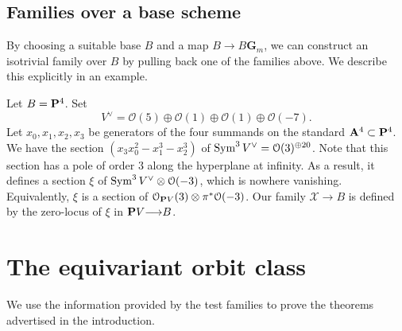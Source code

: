 \documentclass[12pt,reqno]{amsart}
\renewcommand{\to}{{\longrightarrow}}
\numberwithin{equation}{section}
\newcommand{\G}{\mathbf G}
\begin{document}
\subsection{Families over a base scheme}\label{sec:schematicexample}
By choosing a suitable base $B$ and a map $B \to B \G_m$, we
can construct an isotrivial family over $B$ by pulling back one of the
families above.  We describe this explicitly in an example.

Let $B = \P^4$.  Set
\[V^\vee = \mathcal O(5) \oplus \mathcal O(1) \oplus \mathcal O(1) \oplus
  \mathcal O(-7).\] Let $x_0, x_1, x_2, x_3$ be generators of the four
summands on the standard $\A^4 \subset \P^4$.  We have
the section $(x_3x_0^2-x_1^3-x_2^3)$ of
$\Sym^3 V^\vee = \mathcal O(3)^{\oplus 20}$.  Note that this section has a
pole of order $3$ along the hyperplane at infinity.  As a result, it
defines a section $\xi$ of $\Sym^3 V^\vee \otimes \mathcal O(-3)$, which is
nowhere vanishing.  Equivalently, $\xi$ is a section of
$\mathcal O_{\P V}(3) \otimes \pi^* \mathcal O(-3)$.  Our family
$\mathcal X \to B$ is defined by the zero-locus of $\xi$ in
$\P V \to B$.

\section{The equivariant orbit class}
We use the information provided by the test families to prove the theorems advertised in the introduction.
\end{document}
